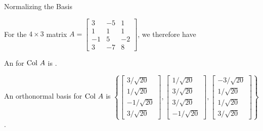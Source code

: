 \documentclass[xcolor=dvipsnames,aspectratio=169,t]{beamer}
\begin{document}
\begin{frame}{Normalizing the Basis}
  \smallskip

  For the $4 \times 3$ matrix $A = \begin{bmatrix} 3 & -5 & 1 \\ 1 & 1 & 1 \\ -1 & 5 & -2 \\ 3 & -7 & 8 \end{bmatrix}$, we therefore have
  \medskip

  \bi

  \ii An  for $\mbox{Col } A$ is  .

  \bs

  \pause
  \ii An \alert{orthonormal basis} for $\mbox{Col } A$ is  \alert{$\left\{ \begin{bmatrix} 3/\sqrt{20}\\ 1/\sqrt{20} \\ -1/\sqrt{20} \\ 3/\sqrt{20} \end{bmatrix} , \begin{bmatrix} 1/\sqrt{20} \\ 3/\sqrt{20} \\ 3/\sqrt{20} \\ -1/\sqrt{20} \end{bmatrix}, \begin{bmatrix} -3/\sqrt{20} \\ 1/\sqrt{20} \\ 1/\sqrt{20} \\ 3/\sqrt{20} \end{bmatrix} \right\}$}.
  \ei
\end{frame}
\end{document}
